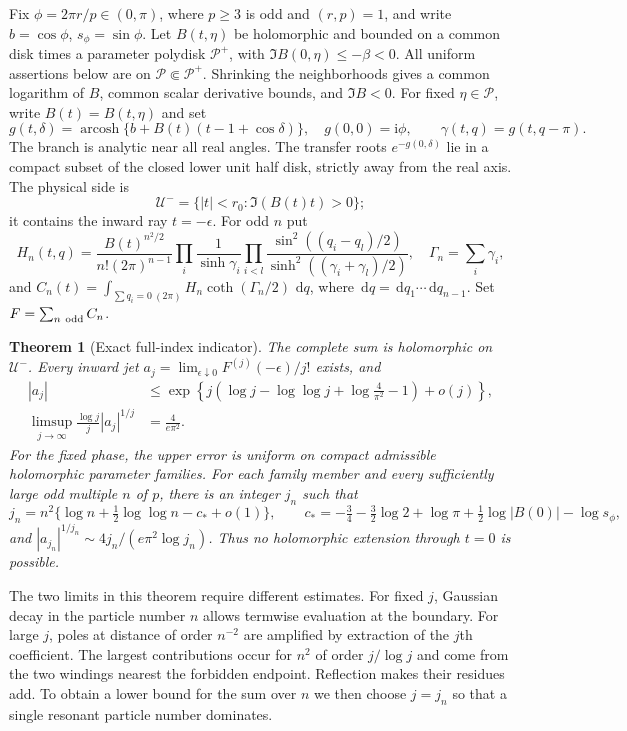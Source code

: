\documentclass[11pt]{article}
\numberwithin{equation}{section}
\newtheorem{theorem}{Theorem}[section]
\theoremstyle{definition}
\newcommand{\ii}{\mathrm i}
\newcommand{\dd}{\,\mathrm d}
\begin{document}
Fix $\phi=2\pi r/p\in(0,\pi)$, where $p\ge3$ is odd and
$(r,p)=1$, and write $b=\cos\phi$, $s_\phi=\sin\phi$.
Let $B(t,\eta)$ be holomorphic and bounded on a common disk times
a parameter polydisk $\mathcal P^+$, with
$\Im B(0,\eta)\le-\beta<0$.  All uniform assertions below are on
$\mathcal P\Subset\mathcal P^+$.  Shrinking the neighborhoods gives a common
logarithm of $B$, common scalar derivative bounds, and $\Im B<0$.
For fixed $\eta\in\mathcal P$, write $B(t)=B(t,\eta)$ and set
\[
 g(t,\delta)=\operatorname{arcosh}
       \{b+B(t)(t-1+\cos\delta)\},\quad g(0,0)=\ii\phi,
 \qquad \gamma(t,q)=g(t,q-\pi).
\]
The branch is analytic near all real angles. The transfer roots $e^{-g(0,\delta)}$
lie in a compact subset of the closed lower unit half disk, strictly
away from the real axis.  The physical side is
\[
             \mathcal U^- =\{|t|<r_0:\Im(B(t)t)>0\};
\]
it contains the inward ray $t=-\epsilon$.
For odd $n$ put
\[
 H_n(t,q)=\frac{B(t)^{n^2/2}}{n!(2\pi)^{n-1}}
 \prod_i\frac1{\sinh\gamma_i}
 \prod_{i<l}\frac{\sin^2((q_i-q_l)/2)}
                  {\sinh^2((\gamma_i+\gamma_l)/2)},\quad
 \Gamma_n=\sum_i\gamma_i,
\]
and $C_n(t)=\int_{\sum q_i=0\ (2\pi)}H_n\coth(\Gamma_n/2)\,\dd q$,
where $\dd q=\dd q_1\cdots\dd q_{n-1}$. Set $F=\sum_{n\ {\rm odd}}C_n$.

\begin{theorem}[Exact full-index indicator]\label{neg:new:indicator}
The complete sum is holomorphic on $\mathcal U^-$.  Every inward jet
$a_j=\lim_{\epsilon\downarrow0}F^{(j)}(-\epsilon)/j!$ exists, and
\begin{align}
 |a_j|&\le\exp\left\{j\left(\log j-\log\log j+
                         \log\frac4{\pi^2}-1\right)+o(j)\right\},
                                                        \label{neg:new:allj}\\
 \limsup_{j\to\infty}\frac{\log j}{j}|a_j|^{1/j}
      &=\frac4{e\pi^2}.                                \label{neg:new:type}
\end{align}
For the fixed phase, the upper error is uniform on compact admissible
holomorphic parameter families. For each family member and every
sufficiently large odd multiple $n$ of $p$, there is an integer $j_n$
such that
\[
 j_n=n^2\{\log n+\tfrac12\log\log n-c_*+o(1)\},\qquad
 c_*=-\tfrac34-\tfrac32\log2+\log\pi+
                       \tfrac12\log|B(0)|-\log s_\phi,
\]
and $|a_{j_n}|^{1/j_n}\sim4j_n/(e\pi^2\log j_n)$.
Thus no holomorphic extension through $t=0$ is possible.
\end{theorem}

The two limits in this theorem require different estimates. For fixed
$j$, Gaussian decay in the particle number $n$ allows termwise
evaluation at the boundary. For large $j$, poles at distance of order
$n^{-2}$ are amplified by extraction of the $j$th coefficient. The
largest contributions occur for $n^2$ of order $j/\log j$ and come
from the two windings nearest the forbidden endpoint. Reflection makes
their residues add. To obtain a lower bound for the sum over $n$ we
then choose $j=j_n$ so that a single resonant particle number dominates.
\end{document}
